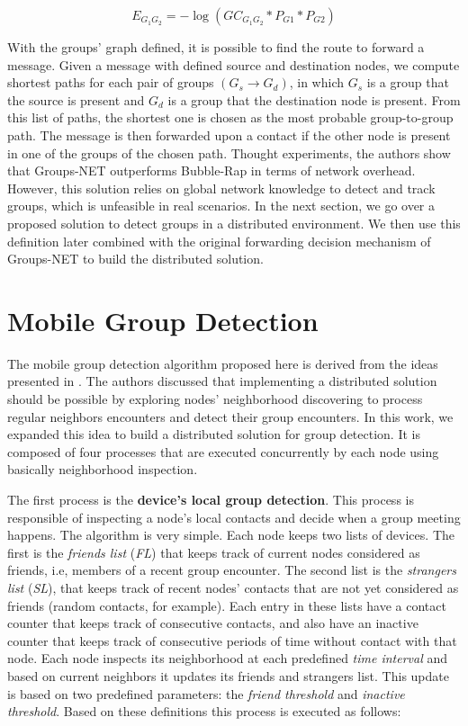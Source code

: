 \begin{equation}
    \label{eq:edgeWeight}
    E_{G_1G_2} = -\log(GC_{G_1G_2} * P_{G1} * P_{G2})
\end{equation}

With the groups' graph defined, it is possible to find the route to forward a message. Given a message with defined source and destination nodes, we compute shortest paths for each pair of groups $(G_s \rightarrow G_d)$, in which $G_s$ is a group that the source is present and $G_d$ is a group that the destination node is present. From this list of paths, the shortest one is chosen as the most probable group-to-group path. The message is then forwarded upon a contact if the other node is present in one of the groups of the chosen path. Thought experiments, the authors show that Groups-NET outperforms Bubble-Rap in terms of network overhead. However, this solution relies on global network knowledge to detect and track groups, which is unfeasible in real scenarios. In the next section, we go over a proposed solution to detect groups in a distributed environment. We then use this definition later combined with the original forwarding decision mechanism of Groups-NET to build the distributed solution.

\section{Mobile Group Detection}
\label{sec:distributedGroupsNET}

The mobile group detection algorithm proposed here is derived from the ideas presented in \citep{groupMobility}. The authors discussed that implementing a distributed solution should be possible by exploring nodes' neighborhood discovering to process regular neighbors encounters and detect their group encounters. In this work, we expanded this idea to build a distributed solution for group detection. It is composed of four processes that are executed concurrently by each node using basically neighborhood inspection.

The first process is the \textbf{device's local group detection}. This process is responsible of inspecting a node's local contacts and decide when a group meeting happens. The algorithm is very simple. Each node keeps two lists of devices. The first is the \textit{friends list} (\textit{FL}) that keeps track of current nodes considered as friends, i.e, members of a recent group encounter. The second list is the \textit{strangers list} (\textit{SL}), that keeps track of recent nodes' contacts that are not yet considered as friends (random contacts, for example). Each entry in these lists have a contact counter that keeps track of consecutive contacts, and also have an inactive counter that keeps track of consecutive periods of time without contact with that node. Each node inspects its neighborhood at each predefined \textit{time interval} and based on current neighbors it updates its friends and strangers list. This update is based on two predefined parameters: the \textit{friend threshold} and \textit{inactive threshold}. Based on these definitions this process is executed as follows:

